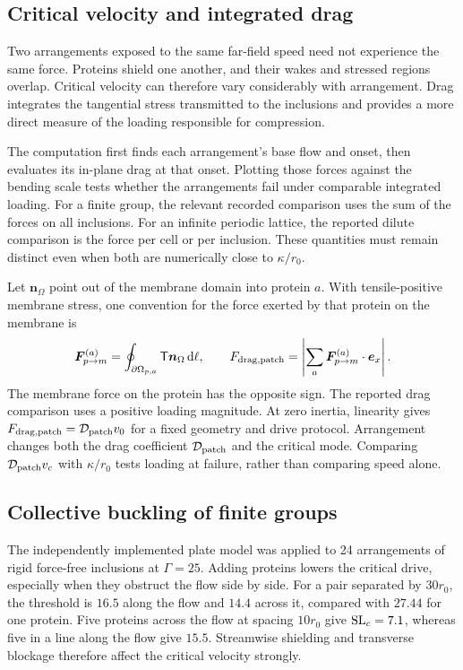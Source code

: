 \subsection{Critical velocity and integrated drag}
Two arrangements exposed to the same far-field speed need not experience the same force. Proteins shield one another, and their wakes and stressed regions overlap. Critical velocity can therefore vary considerably with arrangement. Drag integrates the tangential stress transmitted to the inclusions and provides a more direct measure of the loading responsible for compression.

The computation first finds each arrangement's base flow and onset, then evaluates its in-plane drag at that onset. Plotting those forces against the bending scale tests whether the arrangements fail under comparable integrated loading. For a finite group, the relevant recorded comparison uses the sum of the forces on all inclusions. For an infinite periodic lattice, the reported dilute comparison is the force per cell or per inclusion. These quantities must remain distinct even when both are numerically close to $\kappa/r_0$.


Let $\bm n_\Omega$ point out of the membrane domain into protein $a$. With tensile-positive membrane stress, one convention for the force exerted by that protein on the membrane is
\begin{equation}
\bm F_{p\to m}^{(a)}=\oint_{\partial\Omega_{p,a}}\mathsf T\bm n_\Omega\,\mathrm{d}\ell,
\qquad
F_{\rm drag,patch}=\left|\sum_a\bm F_{p\to m}^{(a)}\cdot\bm e_x\right|.
\label{eq:integrated-drag}
\end{equation}
The membrane force on the protein has the opposite sign. The reported drag comparison uses a positive loading magnitude. At zero inertia, linearity gives $F_{\rm drag,patch}=\mathcal D_{\rm patch}v_0$ for a fixed geometry and drive protocol. Arrangement changes both the drag coefficient $\mathcal D_{\rm patch}$ and the critical mode. Comparing $\mathcal D_{\rm patch}v_c$ with $\kappa/r_0$ tests loading at failure, rather than comparing speed alone.

\subsection{Collective buckling of finite groups}


The independently implemented plate model was applied to 24 arrangements of rigid force-free inclusions at $\Gamma=25$. Adding proteins lowers the critical drive, especially when they obstruct the flow side by side. For a pair separated by $30r_0$, the threshold is $16.5$ along the flow and $14.4$ across it, compared with $27.44$ for one protein. Five proteins across the flow at spacing $10r_0$ give $\mathrm{SL}_c=7.1$, whereas five in a line along the flow give $15.5$. Streamwise shielding and transverse blockage therefore affect the critical velocity strongly.

